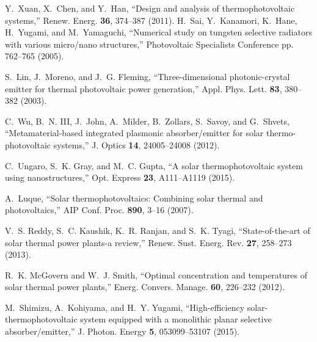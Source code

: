 \documentclass[10pt,letterpaper]{article}
\begin{document}
\begin{thebibliography}{100}
Y.~Xuan, X.~Chen, and Y.~Han, \enquote{Design and analysis of
  thermophotovoltaic systems,} Renew. Energ. \textbf{36}, 374--387 (2011).
H.~Sai, Y.~Kanamori, K.~Hane, H.~Yugami, and M.~Yamaguchi, \enquote{Numerical
  study on tungsten selective radiators with various micro/nano structures,}
  Photovoltaic Specialists Conference pp. 762--765 (2005).

S.~Lin, J.~Moreno, and J.~G. Fleming, \enquote{{Three-dimensional
  photonic-crystal emitter for thermal photovoltaic power generation},} Appl.
  Phys. Lett. \textbf{83}, 380--382 (2003).

C.~Wu, B.~N. III, J.~John, A.~Milder, B.~Zollars, S.~Savoy, and G.~Shvets,
  \enquote{Metamaterial-based integrated plasmonic absorber/emitter for solar
  thermo-photovoltaic systems,} J. Optics \textbf{14}, 24005--24008 (2012).

C.~Ungaro, S.~K. Gray, and M.~C. Gupta, \enquote{A solar thermophotovoltaic
  system using nanostructures,} Opt. Express \textbf{23}, A111--A1119 (2015).

A.~Luque, \enquote{Solar thermophotovoltaics: Combining solar thermal and
  photovoltaics,} AIP Conf. Proc. \textbf{890}, 3--16 (2007).

V.~S. Reddy, S.~C. Kaushik, K.~R. Ranjan, and S.~K. Tyagi,
  \enquote{State-of-the-art of solar thermal power plants-a review,} Renew.
  Sust. Energ. Rev. \textbf{27}, 258--273 (2013).

R.~K. McGovern and W.~J. Smith, \enquote{Optimal concentration and temperatures
  of solar thermal power plants,} Energ. Convers. Manage. \textbf{60}, 226--232
  (2012).

M.~Shimizu, A.~Kohiyama, and H.~Y. Yugami, \enquote{High-efficiency
  solar-thermophotovoltaic system equipped with a monolithic planar selective
  absorber/emitter,} J. Photon. Energy \textbf{5}, 053099--53107 (2015).

\end{thebibliography}
                                                                                                                                                 
\end{document}
